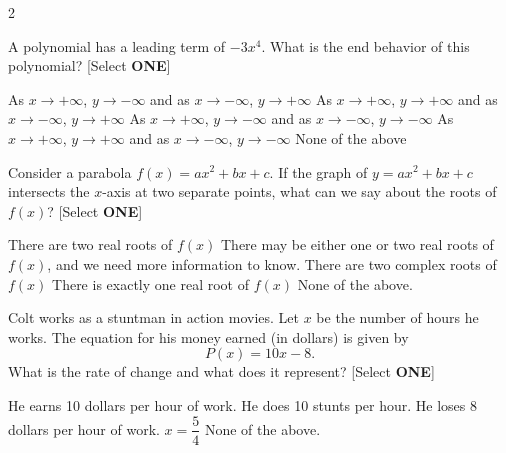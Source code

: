 \begin{questions}
\begin{multicols}{2}
\begin{checkboxes}
        \end{checkboxes}
    \end{multicols}
\vfill

\question[3]
    A polynomial has a leading term of $-3x^4$. What is the end behavior of this polynomial? [Select \textbf{ONE}]
    \begin{choices}
        \choice \chooseone As $x\to +\infty$, $y\to -\infty$ and as $x\to -\infty$, $y\to +\infty$
        \choice \chooseone As $x\to +\infty$, $y\to +\infty$ and as $x\to -\infty$, $y\to +\infty$
        \choice \chooseone As $x\to +\infty$, $y\to -\infty$ and as $x\to -\infty$, $y\to -\infty$
        \choice \chooseone As $x\to +\infty$, $y\to +\infty$ and as $x\to -\infty$, $y\to -\infty$
        \choice \chooseone None of the above
    \end{choices}
\vfill

\newpage
\question[3]
    Consider a parabola $f(x)=ax^2+bx+c$. If the graph of $y=ax^2+bx+c$ intersects the $x$-axis at two separate points, what can we say about the roots of $f(x)$? [Select \textbf{ONE}]
    \begin{choices}
        \choice \chooseone There are two real roots of $f(x)$
        \choice \chooseone There may be either one or two real roots of $f(x)$, and we need more information to know.
        \choice \chooseone There are two complex roots of $f(x)$
        \choice \chooseone There is exactly one real root of $f(x)$
        \choice \chooseone None of the above.
    \end{choices}
\vspace{3em}


\question[3] %
    Colt works as a stuntman in action movies. Let $x$ be the number of hours he works. The equation for his money earned (in dollars) is given by
    \[ P(x) = 10 x-8.\]
    What is the rate of change and what does it represent? [Select \textbf{ONE}]
    \begin{choices}
        \choice \chooseone He earns 10 dollars per hour of work.
        \choice \chooseone He does 10 stunts per hour.
        \choice \chooseone He loses 8 dollars per hour of work.
        \choice \chooseone $x=\dfrac{5}{4}$
        \choice \chooseone None of the above.
    \end{choices}



\newpage


\end{questions}
